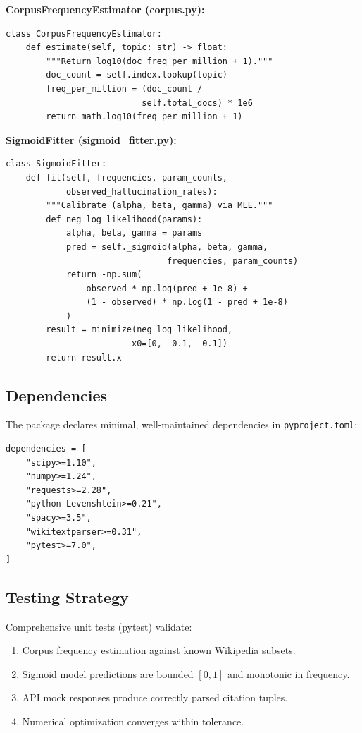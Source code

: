 \documentclass[11pt,a4paper]{article}
\begin{document}
\textbf{CorpusFrequencyEstimator (corpus.py):}
\begin{verbatim}
class CorpusFrequencyEstimator:
    def estimate(self, topic: str) -> float:
        """Return log10(doc_freq_per_million + 1)."""
        doc_count = self.index.lookup(topic)
        freq_per_million = (doc_count / 
                           self.total_docs) * 1e6
        return math.log10(freq_per_million + 1)
\end{verbatim}

\textbf{SigmoidFitter (sigmoid\_fitter.py):}
\begin{verbatim}
class SigmoidFitter:
    def fit(self, frequencies, param_counts, 
            observed_hallucination_rates):
        """Calibrate (alpha, beta, gamma) via MLE."""
        def neg_log_likelihood(params):
            alpha, beta, gamma = params
            pred = self._sigmoid(alpha, beta, gamma, 
                                frequencies, param_counts)
            return -np.sum(
                observed * np.log(pred + 1e-8) + 
                (1 - observed) * np.log(1 - pred + 1e-8)
            )
        result = minimize(neg_log_likelihood, 
                         x0=[0, -0.1, -0.1])
        return result.x
\end{verbatim}

\subsection{Dependencies}

The package declares minimal, well-maintained dependencies in \texttt{pyproject.toml}:
\begin{verbatim}
dependencies = [
    "scipy>=1.10",
    "numpy>=1.24",
    "requests>=2.28",
    "python-Levenshtein>=0.21",
    "spacy>=3.5",
    "wikitextparser>=0.31",
    "pytest>=7.0",
]
\end{verbatim}

\subsection{Testing Strategy}

Comprehensive unit tests (pytest) validate:
\begin{enumerate}
\item Corpus frequency estimation against known Wikipedia subsets.
\item Sigmoid model predictions are bounded $[0,1]$ and monotonic in frequency.
\item API mock responses produce correctly parsed citation tuples.
\item Numerical optimization converges within tolerance.
\end{enumerate}
\end{document}
